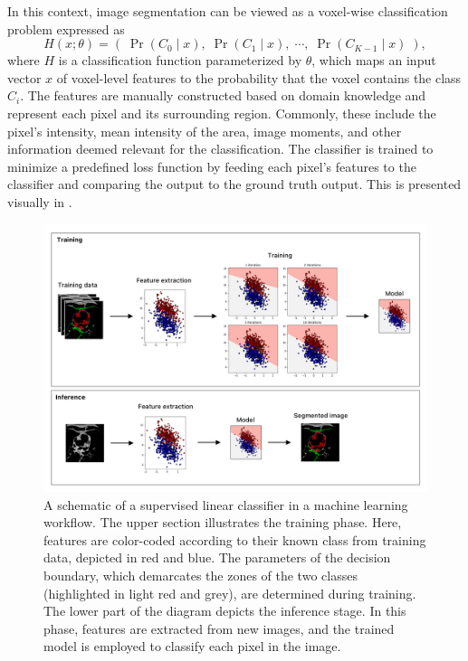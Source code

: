 In this context, image segmentation can be viewed as a voxel-wise classification problem expressed as
\begin{equation}
H(x; \theta) = (\;\operatorname{Pr}(C_0\!\mid\!x),\; \operatorname{Pr}(C_1\!\mid\!x),\; \cdots,\; \operatorname{Pr}(C_{K-1}\!\mid\!x)\;),
\end{equation}
where $H$ is a classification function parameterized by $\theta$, which maps an input vector $x$ of voxel-level features to the probability that the voxel contains the class $C_i$. The features are manually constructed based on domain knowledge and represent each pixel and its surrounding region. Commonly, these include the pixel's intensity, mean intensity of the area, image moments, and other information deemed relevant for the classification. The classifier is trained to minimize a predefined loss function by feeding each pixel's features to the classifier and comparing the output to the ground truth output. This is presented visually in .

\begin{figure}[t!]
 \centering
 \includegraphics[width=\linewidth]{images/machine_learning.png}
 \caption{A schematic of a supervised linear classifier in a machine learning workflow. The upper section illustrates the training phase. Here, features are color-coded according to their known class from training data, depicted in red and blue. The parameters of the decision boundary, which demarcates the zones of the two classes (highlighted in light red and grey), are determined during training. The lower part of the diagram depicts the inference stage. In this phase, features are extracted from new images, and the trained model is employed to classify each pixel in the image. \cite{bencevicRecentProgressEpicardial2022}}
 \label{fig:machine-learning}
 \end{figure}

